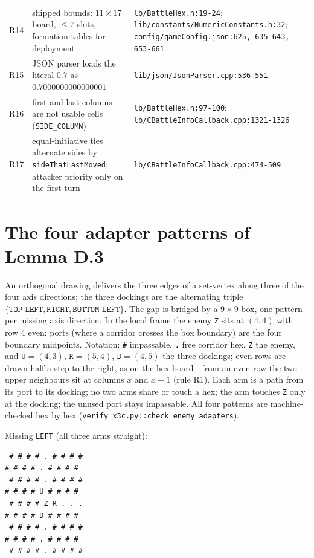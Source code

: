 \documentclass[11pt,a4paper]{article}
\theoremstyle{plain}
\theoremstyle{definition}
\theoremstyle{plain}
\theoremstyle{definition}
\theoremstyle{remark}
\newcommand{\src}[1]{\texttt{#1}}
\begin{document}
\begin{longtable}{@{}p{0.8cm}p{6.0cm}p{6.8cm}@{}}
R14 & shipped bounds: $11\times 17$ board, $\le 7$ slots, formation tables for deployment & \src{lb/BattleHex.h:19-24}; \src{lib/constants/NumericConstants.h:32}; \src{config/gameConfig.json:625, 635-643, 653-661} \\
R15 & JSON parser loads the literal $0.7$ as $0.7000000000000001$ & \src{lib/json/JsonParser.cpp:536-551} \\
R16 & first and last columns are not usable cells (\src{SIDE\_COLUMN}) & \src{lb/BattleHex.h:97-100}; \src{lb/CBattleInfoCallback.cpp:1321-1326} \\
R17 & equal-initiative ties alternate sides by \src{sideThatLastMoved}; attacker priority only on the first turn & \src{lb/CBattleInfoCallback.cpp:474-509} \\
\end{longtable}
\endgroup

\section{The four adapter patterns of Lemma D.3}\label{app:adapters}

An orthogonal drawing delivers the three edges of a set-vertex along three of the four axis
directions; the three dockings are the alternating triple
$\{\texttt{TOP\_LEFT},\texttt{RIGHT},\texttt{BOTTOM\_LEFT}\}$. The gap is bridged by a
$9\times 9$ box, one pattern per missing axis direction. In the local frame the enemy \texttt{Z}
sits at $(4,4)$ with row 4 even; ports (where a corridor crosses the box boundary) are the four
boundary midpoints. Notation: \texttt{\#} impassable, \texttt{.} free corridor hex, \texttt{Z}
the enemy, and $\texttt{U}=(4,3)$, $\texttt{R}=(5,4)$, $\texttt{D}=(4,5)$ the three dockings;
even rows are drawn half a step to the right, as on the hex board---from an even row the
two upper neighbours sit at columns $x$ and $x+1$ (rule R1). Each arm is a path from its
port to its docking; no two arms share or touch a hex; the arm touches \texttt{Z} only at the
docking; the unused port stays impassable. All four patterns are machine-checked hex by hex
(\src{verify\_x3c.py::check\_enemy\_adapters}).


\noindent Missing \texttt{LEFT} (all three arms straight):

\begin{verbatim}
 # # # # . # # # #
# # # # . # # # #
 # # # # . # # # #
# # # # U # # # #
 # # # # Z R . . .
# # # # D # # # #
 # # # # . # # # #
# # # # . # # # #
 # # # # . # # # #
\end{verbatim}
\end{document}
